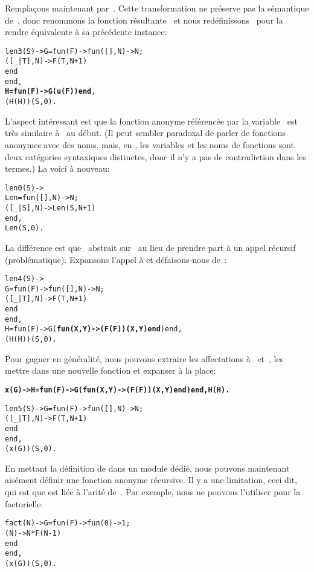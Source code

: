 Remplaçons maintenant  par~. Cette
transformation ne préserve pas la sémantique de~, donc
renommons la fonction résultante~ et nous
redéfinissons~ pour la rendre équivalente à sa précédente
instance:
\begin{alltt}
len3(S) -> G = fun(F) -> fun(   [],N) -> N;
                            ([_|T],N) -> F(T,N+1)
                         end
               end,
           \textbf{H = fun(F) -> G(u(F)) end},
           (H(H))(S,0).
\end{alltt}
L'aspect intéressant est que la fonction anonyme référencée par la
variable~ est très similaire à~ au début. (Il
peut sembler paradoxal de parler de fonctions anonymes avec des noms,
mais, en \Erlang, les variables et les noms de fonctions sont deux
catégories syntaxiques distinctes, donc il n'y a pas de contradiction
dans les termes.) La voici à nouveau:
\begin{alltt}
len0(S) ->
 Len = fun(   [],N) -> N;
          ([\_|S],N) -> Len(S,N+1)\hfill% \emph{Malheureusement invalide}
       end,
 Len(S,0).
\end{alltt}
La différence est que ~abstrait sur~ au lieu de
prendre part à un appel récursif (problématique). Expansons l'appel à
 et défaisons-nous de~:
\begin{alltt}
len4(S) ->
  G = fun(F) -> fun(   [],N) -> N;
                   ([\_|T],N) -> F(T,N+1)
                end
      end,
  H = fun(F) -> G(\textbf{fun(X,Y) -> (F(F))(X,Y) end}) end,
  (H(H))(S,0).
\end{alltt}
Pour gagner en généralité, nous pouvons extraire les affectations à~ et~, les mettre dans une nouvelle fonction
 et expanser  à la place:
\begin{alltt}
\textbf{x(G) -> H=fun(F) -> G(fun(X,Y)->(F(F))(X,Y) end) end, H(H).}

len5(S) -> G = fun(F) -> fun(   [],N) -> N;
                            ([\_|T],N) -> F(T,N+1)
                         end
               end,
           (x(G))(S,0).
\end{alltt}
En mettant la définition de  dans un module dédié, nous
pouvons maintenant aisément définir une fonction anonyme récursive. Il
y a une limitation, ceci dit, qui est que  est liée à
l'arité de~. Par exemple, nous ne pouvons l'utiliser pour
la factorielle:
\begin{alltt}
fact(N) -> G = fun(F) -> fun(0) -> 1;
                            (N) -> N * F(N-1)
                         end
               end,
           (x(G))(S,0).\hfill% \emph{Arité différente}
\end{alltt}
